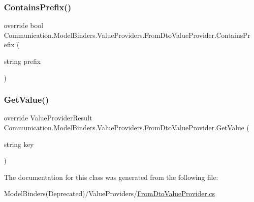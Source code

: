 \subsubsection{\texorpdfstring{Contains\+Prefix()}{ContainsPrefix()}}
{\footnotesize\ttfamily override bool Communication.\+Model\+Binders.\+Value\+Providers.\+From\+Dto\+Value\+Provider.\+Contains\+Prefix (\begin{DoxyParamCaption}\item[{string}]{prefix }\end{DoxyParamCaption})}

\mbox{\label{class_communication_1_1_model_binders_1_1_value_providers_1_1_from_dto_value_provider_a59f5649eff474dd94bf4ce538898272d}} 
\subsubsection{\texorpdfstring{Get\+Value()}{GetValue()}}
{\footnotesize\ttfamily override Value\+Provider\+Result Communication.\+Model\+Binders.\+Value\+Providers.\+From\+Dto\+Value\+Provider.\+Get\+Value (\begin{DoxyParamCaption}\item[{string}]{key }\end{DoxyParamCaption})}



The documentation for this class was generated from the following file\+:\begin{DoxyCompactItemize}
\item 
Model\+Binders(\+Deprecated)/\+Value\+Providers/\mbox{\hyperlink{_from_dto_value_provider_8cs}{From\+Dto\+Value\+Provider.\+cs}}\end{DoxyCompactItemize}
